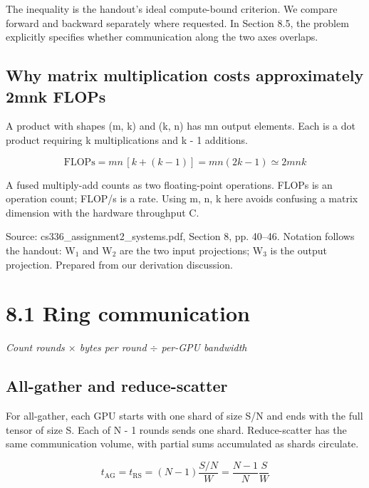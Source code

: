 \documentclass[10pt,a4paper]{article}
\begin{document}
The inequality is the handout's ideal compute-bound criterion. We compare forward and backward separately where requested. In Section 8.5, the problem explicitly specifies whether communication along the two axes overlaps.\par

\subsection*{Why matrix multiplication costs approximately 2mnk FLOPs}

A product with shapes (m, k) and (k, n) has mn output elements. Each is a dot product requiring k multiplications and k - 1 additions.\par

\[\mathrm{FLOPs}=mn\,[k+(k-1)]=mn(2k-1)\simeq 2mnk\]

A fused multiply-add counts as two floating-point operations. FLOPs is an operation count; FLOP/s is a rate. Using m, n, k here avoids confusing a matrix dimension with the hardware throughput C.\par

{\small Source: cs336\_assignment2\_systems.pdf, Section 8, pp. 40--46. Notation follows the handout: W$_1$ and W$_2$ are the two input projections; W$_3$ is the output projection. Prepared from our derivation discussion.}\par

\clearpage

\section*{8.1 \textperiodcentered{} Ring communication}

\textit{Count rounds $\times$ bytes per round $\div$ per-GPU bandwidth}\par

\subsection*{All-gather and reduce-scatter}

For all-gather, each GPU starts with one shard of size S/N and ends with the full tensor of size S. Each of N - 1 rounds sends one shard. Reduce-scatter has the same communication volume, with partial sums accumulated as shards circulate.\par

\[\boxed{t_{\mathrm{AG}}=t_{\mathrm{RS}}=(N-1)\frac{S/N}{W}=\frac{N-1}{N}\frac{S}{W}}\]
\end{document}
